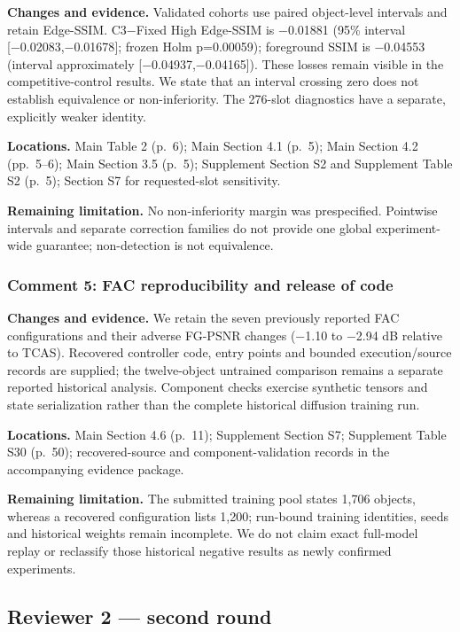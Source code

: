\documentclass[
  10pt,
]{article}
\begin{document}
\textbf{Changes and evidence.} Validated cohorts use paired object-level
intervals and retain Edge-SSIM. C3−Fixed High Edge-SSIM is −0.01881
(95\% interval {[}−0.02083,−0.01678{]}; frozen Holm p=0.00059);
foreground SSIM is −0.04553 (interval approximately
{[}−0.04937,−0.04165{]}). These losses remain visible in the
competitive-control results. We state that an interval crossing zero
does not establish equivalence or non-inferiority. The 276-slot
diagnostics have a separate, explicitly weaker identity.

\textbf{Locations.} Main Table 2 (p.~6); Main Section 4.1 (p.~5); Main
Section 4.2 (pp.~5--6); Main Section 3.5 (p.~5); Supplement Section S2
and Supplement Table S2 (p.~5); Section S7 for requested-slot
sensitivity.

\textbf{Remaining limitation.} No non-inferiority margin was
prespecified. Pointwise intervals and separate correction families do
not provide one global experiment-wide guarantee; non-detection is not
equivalence.

\hypertarget{comment-5-fac-reproducibility-and-release-of-code}{%
\subsubsection{Comment 5: FAC reproducibility and release of
code}\label{comment-5-fac-reproducibility-and-release-of-code}}

\textbf{Changes and evidence.} We retain the seven previously reported
FAC configurations and their adverse FG-PSNR changes (−1.10 to −2.94 dB
relative to TCAS). Recovered controller code, entry points and bounded
execution/source records are supplied; the twelve-object untrained
comparison remains a separate reported historical analysis. Component
checks exercise synthetic tensors and state serialization rather than
the complete historical diffusion training run.

\textbf{Locations.} Main Section 4.6 (p.~11); Supplement Section S7;
Supplement Table S30 (p.~50); recovered-source and component-validation
records in the accompanying evidence package.

\textbf{Remaining limitation.} The submitted training pool states 1,706
objects, whereas a recovered configuration lists 1,200; run-bound
training identities, seeds and historical weights remain incomplete. We
do not claim exact full-model replay or reclassify those historical
negative results as newly confirmed experiments.

\hypertarget{reviewer-2-second-round}{%
\subsection{Reviewer 2 --- second round}\label{reviewer-2-second-round}}
\end{document}
